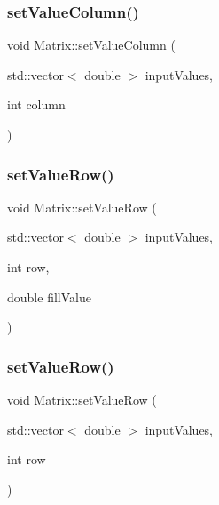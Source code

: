 \mbox{\label{classMatrix_a9af4d3f38ba62a90d31467dd43f48ac1}} 
\subsubsection{\texorpdfstring{set\+Value\+Column()}{setValueColumn()}\hspace{0.1cm}{\footnotesize\ttfamily [2/2]}}
{\footnotesize\ttfamily void Matrix\+::set\+Value\+Column (\begin{DoxyParamCaption}\item[{std\+::vector$<$ double $>$}]{input\+Values,  }\item[{int}]{column }\end{DoxyParamCaption})}

\mbox{\label{classMatrix_ae204cbbd2279c21e0e22fa2fbd1a71ca}} 
\subsubsection{\texorpdfstring{set\+Value\+Row()}{setValueRow()}\hspace{0.1cm}{\footnotesize\ttfamily [1/2]}}
{\footnotesize\ttfamily void Matrix\+::set\+Value\+Row (\begin{DoxyParamCaption}\item[{std\+::vector$<$ double $>$}]{input\+Values,  }\item[{int}]{row,  }\item[{double}]{fill\+Value }\end{DoxyParamCaption})}

\mbox{\label{classMatrix_af331f831fa9f4b800a57280818477cb8}} 
\subsubsection{\texorpdfstring{set\+Value\+Row()}{setValueRow()}\hspace{0.1cm}{\footnotesize\ttfamily [2/2]}}
{\footnotesize\ttfamily void Matrix\+::set\+Value\+Row (\begin{DoxyParamCaption}\item[{std\+::vector$<$ double $>$}]{input\+Values,  }\item[{int}]{row }\end{DoxyParamCaption})}


